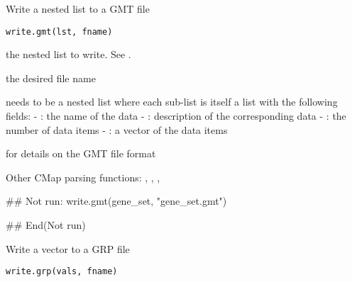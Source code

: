 \documentclass[letterpaper]{book}
\begin{document}
%
\begin{Description}\relax
Write a nested list to a GMT file
\end{Description}
%
\begin{Usage}
\begin{verbatim}
write.gmt(lst, fname)
\end{verbatim}
\end{Usage}
%
\begin{Arguments}
\begin{ldescription}
\item[\code{lst}] the nested list to write. See .

\item[\code{fname}] the desired file name
\end{ldescription}
\end{Arguments}
%
\begin{Details}\relax
{} needs to be a nested list where each 
sub-list is itself a list with the following fields:
- : the name of the data
- : description of the corresponding data
- : the number of data items
- : a vector of the data items
\end{Details}
%
\begin{SeeAlso}\relax
{} for details on the GMT file format

Other CMap parsing functions: ,
, ,
\end{SeeAlso}
%
\begin{Examples}
\begin{ExampleCode}
## Not run: 
write.gmt(gene_set, "gene_set.gmt")

## End(Not run)

\end{ExampleCode}
\end{Examples}
%
\begin{Description}\relax
Write a vector to a GRP file
\end{Description}
%
\begin{Usage}
\begin{verbatim}
write.grp(vals, fname)
\end{verbatim}
\end{Usage}
\end{document}
